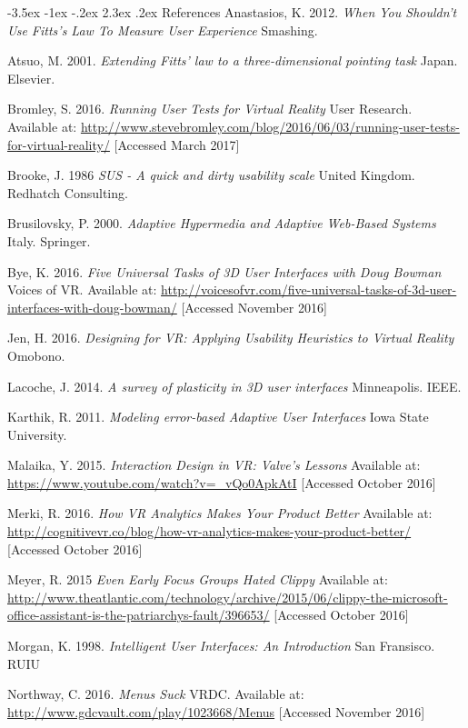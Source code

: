 \documentclass[12pt]{article}
\makeatletter
\renewcommand{\section}{\@startsection {section}{1}{\z@}%
             {-3.5ex \@plus -1ex \@minus -.2ex}%
             {2.3ex \@plus .2ex}%
             {\normalfont\Large\scshape\bfseries}}
\makeatother
\begin{document}
\section{References}
Anastasios, K. 2012. \emph{When You Shouldn't Use Fitts's Law To Measure User Experience} Smashing. 

Atsuo, M. 2001. \emph{Extending Fitts' law to a three-dimensional pointing task} Japan. Elsevier. 

Bromley, S. 2016. \emph{Running User Tests for Virtual Reality} User Research. Available at: \url{http://www.stevebromley.com/blog/2016/06/03/running-user-tests-for-virtual-reality/} [Accessed March 2017]

Brooke, J. 1986 \emph{SUS - A quick and dirty usability scale} United Kingdom. Redhatch Consulting.

Brusilovsky, P. 2000. \emph{Adaptive Hypermedia and Adaptive Web-Based Systems} Italy. Springer.

Bye, K. 2016. \emph{Five Universal Tasks of 3D User Interfaces with Doug Bowman} Voices of VR. Available at: \url{http://voicesofvr.com/five-universal-tasks-of-3d-user-interfaces-with-doug-bowman/} [Accessed November 2016]

Jen, H. 2016. \emph{Designing for VR: Applying Usability Heuristics to Virtual Reality} Omobono. 

Lacoche, J. 2014. \emph{A survey of plasticity in 3D user interfaces} Minneapolis. IEEE. 

Karthik, R. 2011. \emph{Modeling error-based Adaptive User Interfaces} Iowa State University. 

Malaika, Y. 2015. \emph{Interaction Design in VR: Valve's Lessons } Available at: \url{https://www.youtube.com/watch?v=_vQo0ApkAtI} [Accessed October 2016]

Merki, R. 2016. \emph{How VR Analytics Makes Your Product Better} Available at: \url{http://cognitivevr.co/blog/how-vr-analytics-makes-your-product-better/} [Accessed October 2016]

Meyer, R. 2015 \emph{Even Early Focus Groups Hated Clippy} Available at: \url{http://www.theatlantic.com/technology/archive/2015/06/clippy-the-microsoft-office-assistant-is-the-patriarchys-fault/396653/} [Accessed October 2016]

Morgan, K. 1998. \emph{Intelligent User Interfaces: An Introduction} San Fransisco. RUIU 

Northway, C. 2016. \emph{Menus Suck} VRDC. Available at: \url{http://www.gdcvault.com/play/1023668/Menus} [Accessed November 2016]
\end{document}
